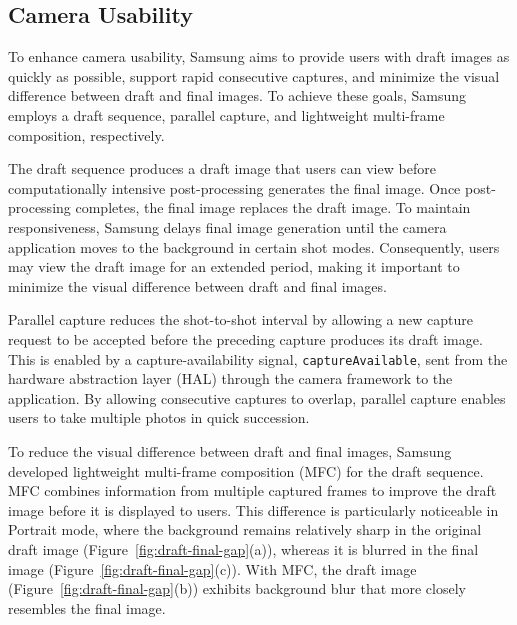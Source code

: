 \subsection{Camera Usability}
\label{sec:camera-usability}
\label{sec:draft-background}

To enhance camera usability, Samsung aims to provide users with draft images as quickly as possible, support rapid consecutive captures, and minimize the visual difference between draft and final images.
To achieve these goals, Samsung employs a draft sequence, parallel capture, and lightweight multi-frame composition, respectively.

The draft sequence produces a draft image that users can view before computationally intensive post-processing generates the final image.
Once post-processing completes, the final image replaces the draft image.
To maintain responsiveness, Samsung delays final image generation until the camera application moves to the background in certain shot modes.
Consequently, users may view the draft image for an extended period, making it important to minimize the visual difference between draft and final images.

Parallel capture reduces the shot-to-shot interval by allowing a new capture request to be accepted before the preceding capture produces its draft image.
This is enabled by a capture-availability signal, \texttt{captureAvailable}, sent from the hardware abstraction layer (HAL) through the camera framework to the application.
By allowing consecutive captures to overlap, parallel capture enables users to take multiple photos in quick succession.

To reduce the visual difference between draft and final images, Samsung developed lightweight multi-frame composition (MFC) for the draft sequence.
MFC combines information from multiple captured frames to improve the draft image before it is displayed to users.
This difference is particularly noticeable in Portrait mode, where the background remains relatively sharp in the original draft image (Figure~\ref{fig:draft-final-gap}(a)), whereas it is blurred in the final image (Figure~\ref{fig:draft-final-gap}(c)).
With MFC, the draft image (Figure~\ref{fig:draft-final-gap}(b)) exhibits background blur that more closely resembles the final image.




\iffalse

